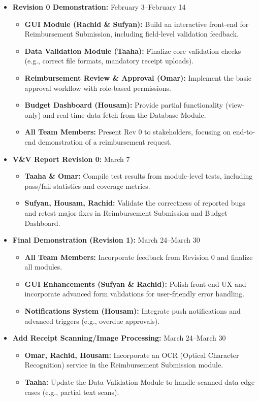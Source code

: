 \documentclass[12pt, titlepage]{article}
\begin{document}
\begin{itemize}
  \item \textbf{Revision 0 Demonstration:} February 3--February 14 
  \begin{itemize}
    \item \textbf{GUI Module (Rachid \& Sufyan):} Build an interactive front-end for Reimbursement Submission, including field-level validation feedback.
    \item \textbf{Data Validation Module (Taaha):} Finalize core validation checks (e.g., correct file formats, mandatory receipt uploads).
    \item \textbf{Reimbursement Review \& Approval (Omar):} Implement the basic approval workflow with role-based permissions.
    \item \textbf{Budget Dashboard (Housam):} Provide partial functionality (view-only) and real-time data fetch from the Database Module.
    \item \textbf{All Team Members:} Present Rev 0 to stakeholders, focusing on end-to-end demonstration of a reimbursement request.
  \end{itemize}
  
  \item \textbf{V\&V Report Revision 0:} March 7 
  \begin{itemize}
    \item \textbf{Taaha \& Omar:} Compile test results from module-level tests, including pass/fail statistics and coverage metrics.
    \item \textbf{Sufyan, Housam, Rachid:} Validate the correctness of reported bugs and retest major fixes in Reimbursement Submission and Budget Dashboard.
  \end{itemize}

  \item \textbf{Final Demonstration (Revision 1):} March 24--March 30 
  \begin{itemize}
    \item \textbf{All Team Members:} Incorporate feedback from Revision 0 and finalize all modules.
    \item \textbf{GUI Enhancements (Sufyan \& Rachid):} Polish front-end UX and incorporate advanced form validations for user-friendly error handling.
    \item \textbf{Notifications System (Housam):} Integrate push notifications and advanced triggers (e.g., overdue approvals).
  \end{itemize}
  
  \item \textbf{Add Receipt Scanning/Image Processing:} March 24--March 30 
  \begin{itemize}
    \item \textbf{Omar, Rachid, Housam:} Incorporate an OCR (Optical Character Recognition) service in the Reimbursement Submission module. 
    \item \textbf{Taaha:} Update the Data Validation Module to handle scanned data edge cases (e.g., partial text scans).
  \end{itemize}
  

\end{itemize}
\end{document}
